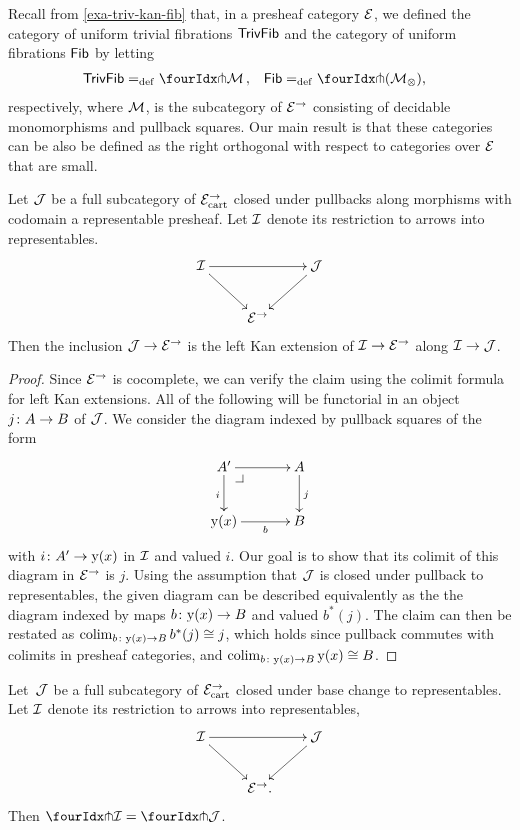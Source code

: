 \documentclass[reqno,10pt,a4paper,oneside,draft]{amsart}
\begin{document}
Recall from \cref{exa-triv-kan-fib} that, in a presheaf category $\catE$, we defined the category of uniform trivial fibrations
$\TrivFib$ and the category of uniform fibrations $\Fib$ by letting
\[
\begin{aligned}
  \TrivFib &\defeq \liftr{\cal{M}}
\, ,&
  \Fib &\defeq \liftr{(\cal{M}_\otimes)}
\rlap{,}
\end{aligned}
\]
respectively, where $\cal{M}$, is the subcategory of $\catE^\to$ consisting of decidable monomorphisms and pullback squares.
Our main result is that these categories can be also be defined as the right orthogonal with respect to categories over
$\catE$ that are small.

\begin{lemma} \label{left-kan-extension-of-representables}
Let $\cal{J}$ be a full subcategory of $\catE_{\cart}^\to$ closed under pullbacks along morphisms with codomain a representable presheaf.
Let $\cal{I}$ denote its restriction to arrows into representables.
\[
\xymatrix{
  \cal{I}
  \ar[rr]
  \ar[dr]
&&
  \cal{J}
  \ar[dl]
\\&
  \catE^\to
}
\]
Then the inclusion $\cal{J} \to \catE^\to$ is the left Kan extension of $\cal{I} \to \catE^\to$ along $\cal{I} \to \cal{J}$.
\end{lemma}

\begin{proof}
Since $\catE^\to$ is cocomplete, we can verify the claim using the colimit formula for left Kan extensions.
All of the following will be functorial in an object $j \co A \to B$ of $\cal{J}$.
We consider the diagram indexed by pullback squares of the form
\[
\xymatrix@C=1.2cm{
  A'
  \ar[r]
  \ar[d]_{i}
  \pullback{dr}
&
  A
  \ar[d]^{j}
\\
  \yon(x)
  \ar[r]_-b
&
  B
}
\]
with $i \co A' \to \yon(x)$ in $\cal{I}$ and valued $i$.
Our goal is to show that its colimit of this diagram in $\catE^\to$ is $j$.
Using the assumption that $\cal{J}$ is closed under pullback to representables, the given diagram can be described equivalently as the the diagram indexed by maps $b \co \yon(x) \to B$ and valued $b^*(j)$.
The claim can then be restated as $\colim_{b \co \yon(x) \to B} b^*(j) \iso j$, which holds since pullback commutes with colimits in presheaf categories, and $\colim_{b \co \yon(x) \to B} \yon(x) \iso B$.
\end{proof}


\begin{proposition} \label{awfs-on-arrows-into-representables}
Let~$\cal{J}$ be a full subcategory of $\catE_{\cart}^\to$ closed under base change to representables.
Let $\cal{I}$ denote its restriction to arrows into representables,
\[
\xymatrix{
  \cal{I}
  \ar[rr]
  \ar[dr]
&&
  \cal{J}
  \ar[dl]
\\&
  \catE^\to
\rlap{.}}
\]
Then $\liftr{\cal{I}} = \liftr{\cal{J}}$.
\end{proposition}
\end{document}
